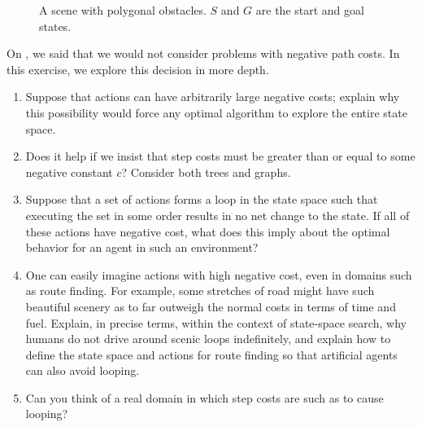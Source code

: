 \begin{figure}[tb]
\caption{A scene with polygonal obstacles. \(S\) and \(G\) are the start and goal states.}
\label{geometric-scene-figure}
\end{figure} 

\begin{exercise}%
On , we said that we would not consider problems with
negative path costs. In this exercise, we explore this decision in more depth.
\begin{enumerate}
\item Suppose that actions can have arbitrarily large negative costs;
explain why this possibility would force any optimal algorithm
to explore the entire state space.
\item Does it help if we insist that step costs must be greater than or equal to
some negative constant \(c\)? Consider both trees and graphs.
\item Suppose that a set of actions forms a loop in the state space such
that executing the set in some order results in no net change to the
state. If all of these actions have negative cost, what does this
imply about the optimal behavior for an agent in such an environment?
\item One can easily imagine actions with high negative cost, even
in domains such as route finding. For example, some stretches of road
might have such beautiful scenery as to far outweigh the normal costs
in terms of time and fuel. Explain, in precise terms, within the context
of state-space search, why humans do
not drive around scenic loops indefinitely, and explain how to define
the state space and actions for route finding so that artificial
agents can also avoid looping. 
\item Can you think of a real domain in which step costs are such as
to cause looping?
\end{enumerate}
\end{exercise} 



